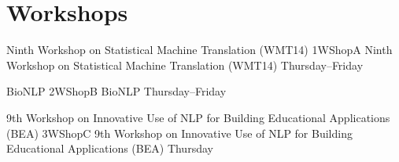 \chapter[Workshops: Thursday--Friday]{Workshops}
\thispagestyle{emptyheader}
\vfill




\clearpage
{}

\begin{wsschedule}
  {Ninth Workshop on Statistical Machine Translation (WMT14)}
  {1}{WShopA}
  {Ninth Workshop on Statistical Machine Translation (WMT14)}
  {Thursday--Friday}
  {\WShopLocA}
  
\end{wsschedule}
        
\begin{wsschedule}
  {BioNLP}
  {2}{WShopB}
  {BioNLP}
  {Thursday--Friday}
  {\WShopLocB}
  
\end{wsschedule}



\begin{wsschedule}
  {9th Workshop on Innovative Use of NLP for Building Educational Applications (BEA)}
  {3}{WShopC}
  {9th Workshop on Innovative Use of NLP for Building Educational Applications (BEA)}
  {Thursday}
  {\WShopLocC}
  \clearpage
\end{wsschedule}

